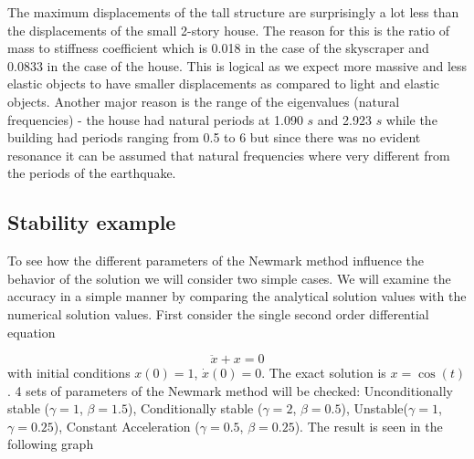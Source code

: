 \documentclass{article}
\begin{document}
The maximum displacements of the tall structure are surprisingly a lot less than the displacements of the small 2-story house. The reason for this is the ratio of mass to stiffness coefficient which is 0.018 in the case of the skyscraper and 0.0833 in the case of the house. This is logical as we expect more massive and less elastic objects to have smaller displacements as compared to light and elastic objects. Another major reason is the range of the eigenvalues (natural frequencies) - the house had natural periods at 1.090 $s$ and 2.923 $s$ while the building had periods ranging from 0.5 to 6 but since there was no evident resonance it can be assumed that natural frequencies where very different from the periods of the earthquake.


	\subsection{Stability example}
To see how the different parameters of the Newmark method influence the behavior of the solution we will consider two simple cases. We will examine the accuracy in a simple manner by comparing the analytical solution values with the numerical solution values. First consider the single second order differential equation

				\begin{equation*}
					\ddot{x} + x = 0
				\end{equation*}
with initial conditions $x(0) = 1$, $\dot{x}(0) = 0$. The exact solution is $x = \cos(t)$. 4 sets of parameters of the Newmark method will be checked: Unconditionally stable ($\gamma = 1$, $\beta = 1.5$), Conditionally stable ($\gamma = 2$, $\beta = 0.5$), Unstable($\gamma = 1$, $\gamma = 0.25$), Constant Acceleration ($\gamma = 0.5$, $\beta = 0.25$). The result is seen in the following graph
\end{document}
